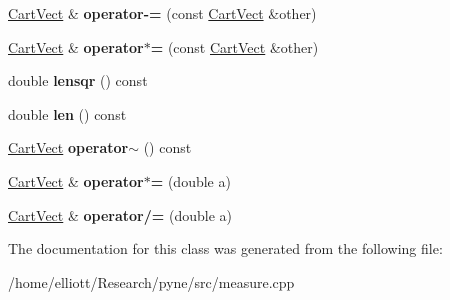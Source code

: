 \begin{DoxyCompactItemize}
\item 
\hypertarget{class_cart_vect_a459252305cedf4e95a997bd46a26e9b8}{\hyperlink{class_cart_vect}{Cart\-Vect} \& {\bfseries operator-\/=} (const \hyperlink{class_cart_vect}{Cart\-Vect} \&other)}\label{class_cart_vect_a459252305cedf4e95a997bd46a26e9b8}

\item 
\hypertarget{class_cart_vect_ae4d813aaf367f7260870b051062a776f}{\hyperlink{class_cart_vect}{Cart\-Vect} \& {\bfseries operator$\ast$=} (const \hyperlink{class_cart_vect}{Cart\-Vect} \&other)}\label{class_cart_vect_ae4d813aaf367f7260870b051062a776f}

\item 
\hypertarget{class_cart_vect_a9ab6e8cdf915cde3cf166a6c8c10ce17}{double {\bfseries lensqr} () const }\label{class_cart_vect_a9ab6e8cdf915cde3cf166a6c8c10ce17}

\item 
\hypertarget{class_cart_vect_a4809574b9b0bc24075da36e5b60e6988}{double {\bfseries len} () const }\label{class_cart_vect_a4809574b9b0bc24075da36e5b60e6988}

\item 
\hypertarget{class_cart_vect_aeafa9899c84e5ed65f3217fc1217e7a2}{\hyperlink{class_cart_vect}{Cart\-Vect} {\bfseries operator$\sim$} () const }\label{class_cart_vect_aeafa9899c84e5ed65f3217fc1217e7a2}

\item 
\hypertarget{class_cart_vect_a3dec977a311cf363e0ce7f2983370b10}{\hyperlink{class_cart_vect}{Cart\-Vect} \& {\bfseries operator$\ast$=} (double a)}\label{class_cart_vect_a3dec977a311cf363e0ce7f2983370b10}

\item 
\hypertarget{class_cart_vect_aaf0806de8642163882bc844e55fa921f}{\hyperlink{class_cart_vect}{Cart\-Vect} \& {\bfseries operator/=} (double a)}\label{class_cart_vect_aaf0806de8642163882bc844e55fa921f}

\end{DoxyCompactItemize}


The documentation for this class was generated from the following file\-:\begin{DoxyCompactItemize}
\item 
/home/elliott/\-Research/pyne/src/measure.\-cpp\end{DoxyCompactItemize}
